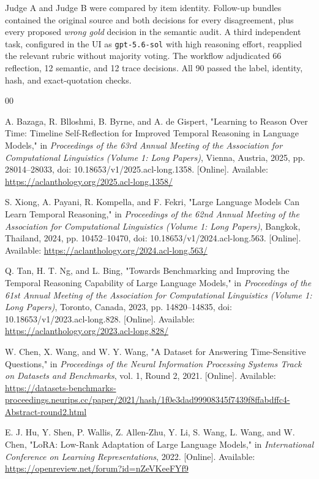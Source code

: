 \documentclass[conference]{IEEEtran}
\begin{document}
Judge A and Judge B were compared by item identity. Follow-up bundles contained
the original source and both decisions for every disagreement, plus every proposed
\emph{wrong gold} decision in the semantic audit. A third independent task,
configured in the UI as \texttt{gpt-5.6-sol} with high reasoning effort,
reapplied the relevant rubric without majority voting. The workflow adjudicated
66 reflection, 12 semantic, and 12 trace decisions. All 90 passed the label,
identity, hash, and exact-quotation checks.

\begin{thebibliography}{00}

A. Bazaga, R. Blloshmi, B. Byrne, and A. de Gispert,
"Learning to Reason Over Time: Timeline Self-Reflection for Improved Temporal Reasoning in Language Models,"
in \emph{Proceedings of the 63rd Annual Meeting of the Association for Computational Linguistics (Volume 1: Long Papers)}, Vienna, Austria, 2025, pp. 28014--28033, doi: 10.18653/v1/2025.acl-long.1358. [Online]. Available: \url{https://aclanthology.org/2025.acl-long.1358/}

S. Xiong, A. Payani, R. Kompella, and F. Fekri,
"Large Language Models Can Learn Temporal Reasoning,"
in \emph{Proceedings of the 62nd Annual Meeting of the Association for Computational Linguistics (Volume 1: Long Papers)}, Bangkok, Thailand, 2024, pp. 10452--10470, doi: 10.18653/v1/2024.acl-long.563. [Online]. Available: \url{https://aclanthology.org/2024.acl-long.563/}

Q. Tan, H. T. Ng, and L. Bing,
"Towards Benchmarking and Improving the Temporal Reasoning Capability of Large Language Models,"
in \emph{Proceedings of the 61st Annual Meeting of the Association for Computational Linguistics (Volume 1: Long Papers)}, Toronto, Canada, 2023, pp. 14820--14835, doi: 10.18653/v1/2023.acl-long.828. [Online]. Available: \url{https://aclanthology.org/2023.acl-long.828/}

W. Chen, X. Wang, and W. Y. Wang,
"A Dataset for Answering Time-Sensitive Questions,"
in \emph{Proceedings of the Neural Information Processing Systems Track on Datasets and Benchmarks}, vol. 1, Round 2, 2021. [Online]. Available: \url{https://datasets-benchmarks-proceedings.neurips.cc/paper/2021/hash/1f0e3dad99908345f7439f8ffabdffc4-Abstract-round2.html}

E. J. Hu, Y. Shen, P. Wallis, Z. Allen-Zhu, Y. Li, S. Wang, L. Wang, and W. Chen,
"LoRA: Low-Rank Adaptation of Large Language Models,"
in \emph{International Conference on Learning Representations}, 2022. [Online]. Available: \url{https://openreview.net/forum?id=nZeVKeeFYf9}


\end{thebibliography}
\end{document}
